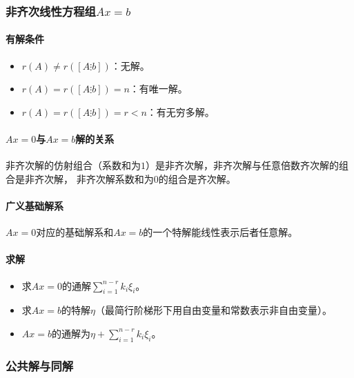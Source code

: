 \documentclass[
12pt, %
a4paper, 
oneside, %
headinclude,footinclude, %
]{scrartcl}
\begin{document}
\subsubsection[非齐次线性方程组]{非齐次线性方程组$ Ax = b $}
\paragraph{有解条件}
\begin{itemize}
\item $ r(A) \neq r([A \vdots b]) $：无解。
\item $ r(A) = r([A \vdots b]) = n $：有唯一解。
\item $ r(A) = r([A \vdots b]) = r < n $：有无穷多解。
\end{itemize}
\paragraph{$ Ax = 0 $与$ Ax = b $解的关系}
非齐次解的仿射组合（系数和为$ 1 $）是非齐次解，非齐次解与任意倍数齐次解的组合是非齐次解，
非齐次解系数和为$ 0 $的组合是齐次解。
\paragraph{广义基础解系}
$ Ax = 0 $对应的基础解系和$ Ax = b $的一个特解能线性表示后者任意解。
\paragraph{求解}
\begin{itemize}
\item 求$ Ax = 0 $的通解$ \sum_{i = 1}^{n - r} k_i \xi_i $。
\item 求$ Ax = b $的特解$ \eta $（最简行阶梯形下用自由变量和常数表示非自由变量）。
\item $ Ax = b $的通解为$ \eta + \sum_{i = 1}^{n - r} k_i \xi_i $。
\end{itemize}
\subsubsection[公共解与同解]{公共解与同解}
\end{document}
